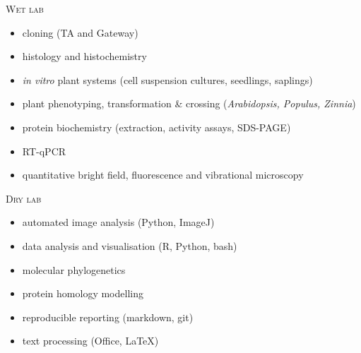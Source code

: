 \documentclass[11pt]{article}
\begin{document}
\newpage


\vspace{0.3cm}

\textsc{\large{Wet lab}} 
\vspace{-0.175cm}
\begin{addmargin}[24pt]{0pt}
	\begin{multicols}{2}
		\raggedright
		\begin{itemize}[itemindent=-9pt,leftmargin=24pt]
			\itemsep-0.1cm
			\item cloning (TA and Gateway)
			\item histology and histochemistry
			\item \textit{in vitro} plant systems (cell suspension cultures, seedlings, saplings)
			\item plant phenotyping, transformation  \& crossing (\textit{Arabidopsis, Populus, Zinnia})
			\item protein biochemistry (extraction, activity assays, SDS-PAGE)
			\item RT-qPCR
			\item quantitative bright field, fluorescence and vibrational microscopy
		\end{itemize}
	\end{multicols}
\end{addmargin}
\vspace{0.2cm}

\textsc{\large{Dry lab}} 
\vspace{-0.175cm}
\begin{addmargin}[24pt]{0pt}
	\begin{multicols}{2}
		\raggedright
		\begin{itemize}[itemindent=-9pt,leftmargin=24pt]
			\itemsep-0.1cm
			\item automated image analysis (Python, ImageJ)
			\item data analysis and visualisation (R, Python, bash)
			\item molecular phylogenetics
			\item protein homology modelling
			\item reproducible reporting (markdown, git)
			\item text processing (Office, LaTeX)
		\end{itemize}
	\end{multicols}
\end{addmargin}
\vspace{0.5cm}
\end{document}
